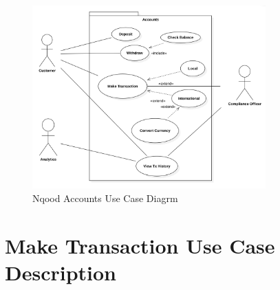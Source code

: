 \documentclass[a4paper]{report}
\begin{document}
\begin{figure}[h!]
    \centering
    \includegraphics[width=0.8\textwidth]{images/nqood-accounts-use-case-diagram.png}
    \caption{Nqood Accounts Use Case Diagrm}
    \label{fig:nqood-accounts-use-case-diagram}
\end{figure}

\section{Make Transaction Use Case Description}
\end{document}
